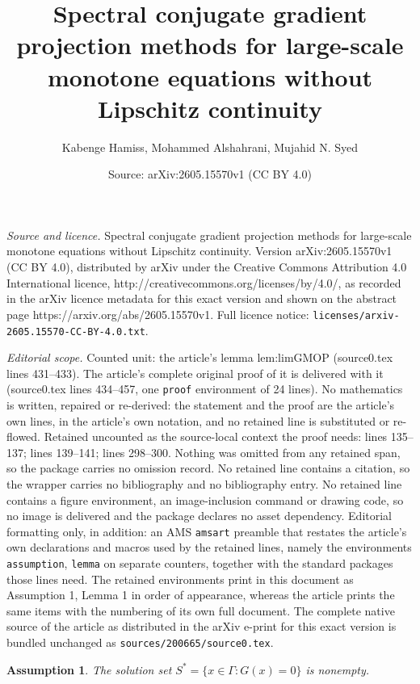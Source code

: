 \documentclass[10pt,a4paper]{amsart}
\title{Spectral conjugate gradient projection methods for large-scale\\ monotone equations without Lipschitz continuity}
\author{Kabenge Hamiss, Mohammed Alshahrani, Mujahid N. Syed}
\date{Source: arXiv:2605.15570v1 (CC BY 4.0)}
\newtheorem{assumption}{Assumption}
\begin{document}
\maketitle

\noindent\emph{Source and licence.} Spectral conjugate gradient projection methods for large-scale\\ monotone equations without Lipschitz continuity. Version arXiv:2605.15570v1 (CC BY 4.0), distributed by arXiv under the Creative Commons Attribution 4.0 International licence, http://creativecommons.org/licenses/by/4.0/, as recorded in the arXiv licence metadata for this exact version and shown on the abstract page https://arxiv.org/abs/2605.15570v1. Full licence notice: \texttt{licenses/arxiv-2605.15570-CC-BY-4.0.txt}.\par\smallskip

\noindent\textit{Editorial scope.} Counted unit: the article's lemma lem:limGMOP (source0.tex lines 431--433). The article's complete original proof of it is delivered with it (source0.tex lines 434--457, one \texttt{proof} environment of 24 lines). No mathematics is written, repaired or re-derived: the statement and the proof are the article's own lines, in the article's own notation, and no retained line is substituted or re-flowed.  Retained uncounted as the source-local context the proof needs: lines 135--137; lines 139--141; lines 298--300.  Nothing was omitted from any retained span, so the package carries no omission record.  No retained line contains a citation, so the wrapper carries no bibliography and no bibliography entry.  No retained line contains a figure environment, an image-inclusion command or drawing code, so no image is delivered and the package declares no asset dependency.  Editorial formatting only, in addition: an AMS \texttt{amsart} preamble that restates the article's own declarations and macros used by the retained lines, namely the environments \texttt{assumption}, \texttt{lemma} on separate counters, together with the standard packages those lines need.  The retained environments print in this document as Assumption 1, Lemma 1 in order of appearance, whereas the article prints the same items with the numbering of its own full document.  The complete native source of the article as distributed in the arXiv e-print for this exact version is bundled unchanged as \texttt{sources/200665/source0.tex}.
\begin{assumption}\label{A1}
The solution set $S^* = \{x \in \Gamma : G(x) = 0\}$ is nonempty.
\end{assumption}
\end{document}
